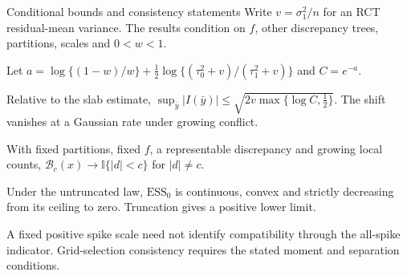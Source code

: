 \documentclass[11pt,aspectratio=169]{beamer}
\newcommand{\key}[1]{{\color{AccentBlue}\textbf{#1}}}
\begin{document}
\begin{frame}{Conditional bounds and consistency statements}
  \footnotesize
  Write $v=\sigma_1^2/n$ for an RCT residual-mean variance. The results condition on $f$, other discrepancy trees, partitions, scales and $0<w<1$.

  Let $a=\log\{(1-w)/w\}+\tfrac12\log\{(\tau_0^2+v)/(\tau_1^2+v)\}$ and $C=e^{-a}$.

  \vspace{0.4em}
  \begin{description}\setlength\itemsep{0.55em}
    \item[\key{Influence}] Relative to the slab estimate,
      $\sup_{\bar y}|I(\bar y)|\le
      \sqrt{2v\max\{\log C,\tfrac12\}}$.
      The shift vanishes at a Gaussian rate under growing conflict.
    \item[\key{Map}] With fixed partitions, fixed $f$, a representable discrepancy and growing local counts,
      $\mathcal B_c(x)\to\mathbb I\{|d|<c\}$ for $|d|\ne c$.
    \item[\key{ESS}] Under the untruncated law, $\mathrm{ESS}_0$ is continuous, convex and strictly decreasing from its ceiling to zero. Truncation gives a positive lower limit.
  \end{description}

  \vfill
  {\scriptsize A fixed positive spike scale need not identify compatibility through the all-spike indicator. Grid-selection consistency requires the stated moment and separation conditions.}
\end{frame}
\end{document}
